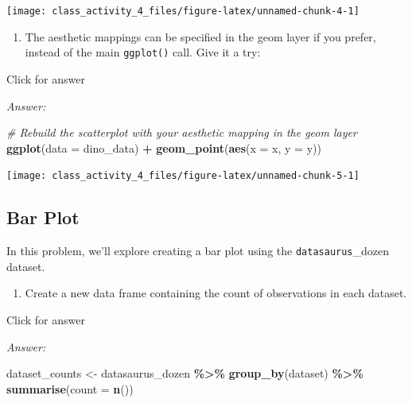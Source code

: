 \documentclass[
]{book}
\newenvironment{Shaded}{\begin{snugshade}}{\end{snugshade}}
\newcommand{\AttributeTok}[1]{\textcolor[rgb]{0.13,0.29,0.53}{#1}}
\newcommand{\CommentTok}[1]{\textcolor[rgb]{0.56,0.35,0.01}{\textit{#1}}}
\newcommand{\FunctionTok}[1]{\textcolor[rgb]{0.13,0.29,0.53}{\textbf{#1}}}
\newcommand{\NormalTok}[1]{#1}
\newcommand{\OtherTok}[1]{\textcolor[rgb]{0.56,0.35,0.01}{#1}}
\newcommand{\SpecialCharTok}[1]{\textcolor[rgb]{0.81,0.36,0.00}{\textbf{#1}}}
\providecommand{\tightlist}{%
  \setlength{\itemsep}{0pt}\setlength{\parskip}{0pt}}
\begin{document}
\texttt{[image: class\_activity\_4\_files/figure-latex/unnamed-chunk-4-1]}

\begin{enumerate}
\def\labelenumi{\alph{enumi}.}
\setcounter{enumi}{2}
\tightlist
\item
  The aesthetic mappings can be specified in the geom layer if you prefer, instead of the main \texttt{ggplot()} call. Give it a try:
\end{enumerate}

Click for answer

\emph{Answer:}

\begin{Shaded}
\begin{Highlighting}[]
\CommentTok{\# Rebuild the scatterplot with your aesthetic mapping in the geom layer}
\FunctionTok{ggplot}\NormalTok{(}\AttributeTok{data =}\NormalTok{ dino\_data) }\SpecialCharTok{+}
   \FunctionTok{geom\_point}\NormalTok{(}\FunctionTok{aes}\NormalTok{(}\AttributeTok{x =}\NormalTok{ x, }\AttributeTok{y =}\NormalTok{ y)) }
\end{Highlighting}
\end{Shaded}

\texttt{[image: class\_activity\_4\_files/figure-latex/unnamed-chunk-5-1]}

\hypertarget{bar-plot}{%
\subsection{Bar Plot}\label{bar-plot}}

In this problem, we'll explore creating a bar plot using the \texttt{datasaurus}\_dozen dataset.

\begin{enumerate}
\def\labelenumi{\alph{enumi}.}
\tightlist
\item
  Create a new data frame containing the count of observations in each dataset.
\end{enumerate}

Click for answer

\emph{Answer:}

\begin{Shaded}
\begin{Highlighting}[]
\NormalTok{dataset\_counts }\OtherTok{\textless{}{-}}\NormalTok{ datasaurus\_dozen }\SpecialCharTok{\%\textgreater{}\%}
  \FunctionTok{group\_by}\NormalTok{(dataset) }\SpecialCharTok{\%\textgreater{}\%}
  \FunctionTok{summarise}\NormalTok{(}\AttributeTok{count =} \FunctionTok{n}\NormalTok{())}
\end{Highlighting}
\end{Shaded}
\end{document}
